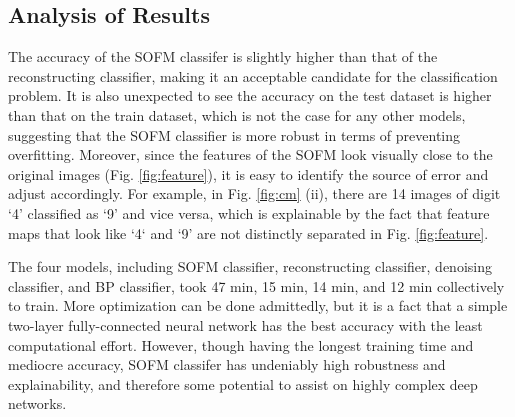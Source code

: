 \documentclass[11pt,titlepage]{article}
\begin{document}
\subsection{Analysis of Results}
The accuracy of the SOFM classifer is slightly higher than that of the reconstructing classifier, making it an acceptable candidate for the classification problem. It is also unexpected to see the accuracy on the test dataset is higher than that on the train dataset, which is not the case for any other models, suggesting that the SOFM classifier is more robust in terms of preventing overfitting. Moreover, since the features of the SOFM look visually close to the original images (Fig. \ref{fig:feature}), it is easy to identify the source of error and adjust accordingly. For example, in Fig. \ref{fig:cm} (ii), there are 14 images of digit `4' classified as `9' and vice versa, which is explainable by the fact that feature maps that look like `4` and `9' are not distinctly separated in Fig. \ref{fig:feature}.

The four models, including SOFM classifier, reconstructing classifier, denoising classifier, and BP classifier, took 47 min, 15 min, 14 min, and 12 min collectively to train. More optimization can be done admittedly, but it is a fact that a simple two-layer fully-connected neural network has the best accuracy with the least computational effort. However, though having the longest training time and mediocre accuracy, SOFM classifer has undeniably high robustness and explainability, and therefore some potential to assist on highly complex deep networks.
\end{document}
